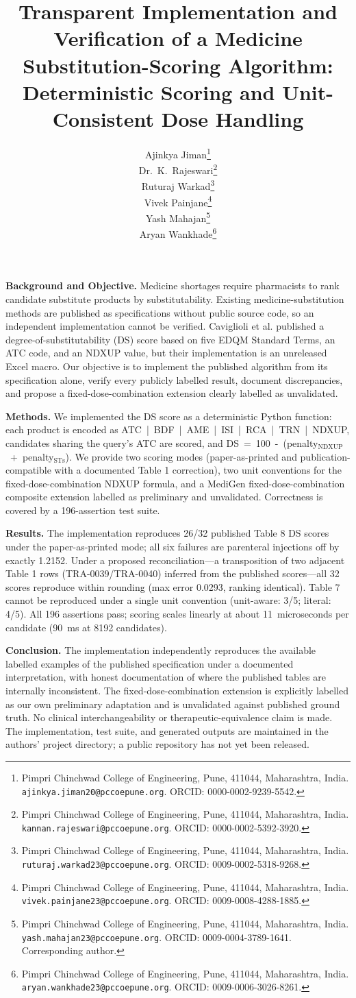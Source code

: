 \documentclass[12pt]{article}
\title{\textbf{Transparent Implementation and Verification of a Medicine Substitution-Scoring Algorithm:\\
Deterministic Scoring and Unit-Consistent Dose Handling}}
\author{
Ajinkya Jiman\thanks{Pimpri Chinchwad College of Engineering, Pune, 411044, Maharashtra, India. \texttt{ajinkya.jiman20@pccoepune.org}. ORCID: 0000-0002-9239-5542.}\\
Dr.~K.~Rajeswari\thanks{Pimpri Chinchwad College of Engineering, Pune, 411044, Maharashtra, India. \texttt{kannan.rajeswari@pccoepune.org}. ORCID: 0000-0002-5392-3920.}\\
Ruturaj Warkad\thanks{Pimpri Chinchwad College of Engineering, Pune, 411044, Maharashtra, India. \texttt{ruturaj.warkad23@pccoepune.org}. ORCID: 0009-0002-5318-9268.}\\
Vivek Painjane\thanks{Pimpri Chinchwad College of Engineering, Pune, 411044, Maharashtra, India. \texttt{vivek.painjane23@pccoepune.org}. ORCID: 0009-0008-4288-1885.}\\
Yash Mahajan\thanks{Pimpri Chinchwad College of Engineering, Pune, 411044, Maharashtra, India. \texttt{yash.mahajan23@pccoepune.org}. ORCID: 0009-0004-3789-1641. Corresponding author.}\\
Aryan Wankhade\thanks{Pimpri Chinchwad College of Engineering, Pune, 411044, Maharashtra, India. \texttt{aryan.wankhade23@pccoepune.org}. ORCID: 0009-0006-3026-8261.}
}
\date{}
\begin{document}
\maketitle

\noindent\textbf{Background and Objective.} Medicine shortages require pharmacists to rank candidate substitute products by substitutability. Existing medicine-substitution methods are published as specifications without public source code, so an independent implementation cannot be verified. Caviglioli et al.\citep{caviglioli2025medicine} published a degree-of-substitutability (DS) score based on five EDQM Standard Terms, an ATC code, and an NDXUP value, but their implementation is an unreleased Excel macro. Our objective is to implement the published algorithm from its specification alone, verify every publicly labelled result, document discrepancies, and propose a fixed-dose-combination extension clearly labelled as unvalidated.

\noindent\textbf{Methods.} We implemented the DS score as a deterministic Python function: each product is encoded as ATC~|~BDF~|~AME~|~ISI~|~RCA~|~TRN~|~NDXUP, candidates sharing the query's ATC are scored, and DS~=~100~-~(penalty$_\text{NDXUP}$~+~penalty$_\text{STs}$). We provide two scoring modes (paper-as-printed and publication-compatible with a documented Table 1 correction), two unit conventions for the fixed-dose-combination NDXUP formula, and a MediGen fixed-dose-combination composite extension labelled as preliminary and unvalidated. Correctness is covered by a 196-assertion test suite.

\noindent\textbf{Results.} The implementation reproduces 26/32 published Table 8 DS scores under the paper-as-printed mode; all six failures are parenteral injections off by exactly 1.2152. Under a proposed reconciliation---a transposition of two adjacent Table 1 rows (TRA-0039/TRA-0040) inferred from the published scores---all 32 scores reproduce within rounding (max error 0.0293, ranking identical). Table 7 cannot be reproduced under a single unit convention (unit-aware: 3/5; literal: 4/5). All 196 assertions pass; scoring scales linearly at about 11~microseconds per candidate (90~ms at 8192 candidates).

\noindent\textbf{Conclusion.} The implementation independently reproduces the available labelled examples of the published specification under a documented interpretation, with honest documentation of where the published tables are internally inconsistent. The fixed-dose-combination extension is explicitly labelled as our own preliminary adaptation and is unvalidated against published ground truth. No clinical interchangeability or therapeutic-equivalence claim is made. The implementation, test suite, and generated outputs are maintained in the authors' project directory; a public repository has not yet been released.
\end{document}
